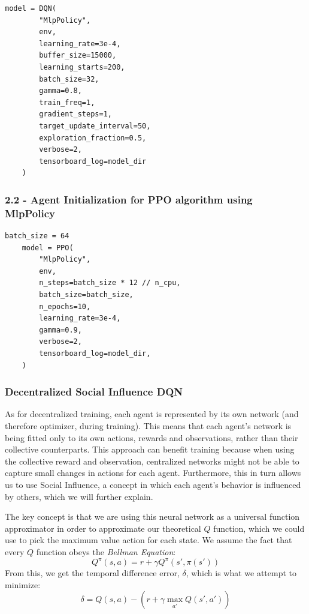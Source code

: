  \begin{lstlisting}[style=python]
    model = DQN(
        "MlpPolicy",
        env,
        learning_rate=3e-4,
        buffer_size=15000,
        learning_starts=200,
        batch_size=32,
        gamma=0.8,
        train_freq=1,
        gradient_steps=1,
        target_update_interval=50,
        exploration_fraction=0.5,
        verbose=2,
        tensorboard_log=model_dir
    )
\end{lstlisting}

\subsubsection{2.2 - Agent Initialization for PPO algorithm using MlpPolicy}

\begin{lstlisting}[style=python]
    batch_size = 64
    model = PPO(
        "MlpPolicy",
        env,
        n_steps=batch_size * 12 // n_cpu,
        batch_size=batch_size,
        n_epochs=10,
        learning_rate=3e-4,
        gamma=0.9,
        verbose=2,
        tensorboard_log=model_dir,
    )
\end{lstlisting}

\subsubsection{Decentralized Social Influence DQN}

As for decentralized training, each agent is represented by its own network (and therefore optimizer, during training). This means that each agent's network is being fitted only to its own actions, rewards and observations, rather than their collective counterparts. This approach can benefit training because when using the collective reward and observation, centralized networks might not be able to capture small changes in actions for each agent. Furthermore, this in turn allows us to use Social Influence, a concept in which each agent's behavior is influenced by others, which we will further explain. 

The key concept is that we are using this neural network as a universal function approximator in order to approximate our theoretical $Q$ function, which we could use to pick the maximum value action for each state. We assume the fact that every $Q$ function obeys the \textit{Bellman Equation}:
\[
Q^\pi(s, a) = r + \gamma Q^\pi(s', \pi(s'))
\]
From this, we get the temporal difference error, $\delta$, which is what we attempt to minimize:
\[
\delta = Q(s, a) - \left(r + \gamma \max_{a'} Q(s', a')\right)
\]

